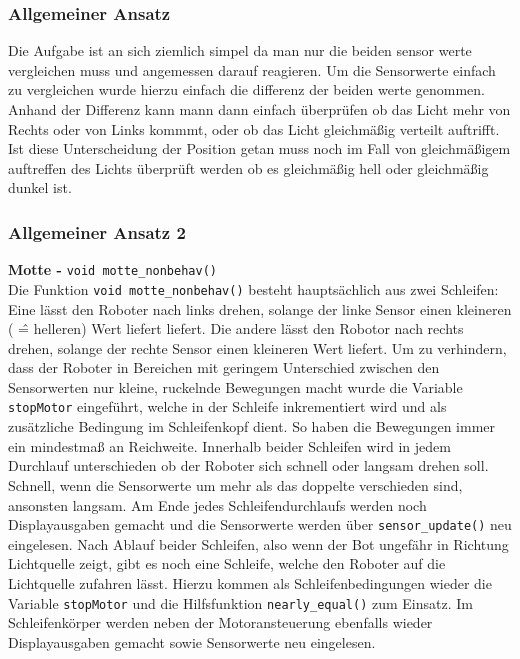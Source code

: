 \subsubsection{Allgemeiner Ansatz}

Die Aufgabe ist an sich ziemlich simpel da man nur die beiden sensor werte vergleichen muss und angemessen darauf reagieren.
Um die Sensorwerte einfach zu vergleichen wurde hierzu einfach die differenz der beiden werte genommen.
Anhand der Differenz kann mann dann einfach überprüfen ob das Licht mehr von Rechts oder von Links kommmt, oder ob das Licht gleichmäßig verteilt auftrifft.
Ist diese Unterscheidung der Position getan muss noch im Fall von gleichmäßigem auftreffen des Lichts überprüft werden ob es gleichmäßig hell oder gleichmäßig dunkel ist.



\subsubsection{Allgemeiner Ansatz 2 }

\textbf{Motte - }\verb+void motte_nonbehav()+\\

Die Funktion \verb+void motte_nonbehav()+ besteht hauptsächlich aus zwei Schleifen: Eine lässt den Roboter nach links drehen, solange der linke Sensor einen kleineren ( \^= helleren) Wert liefert liefert. Die andere lässt den Robotor nach rechts drehen, solange der rechte Sensor einen kleineren Wert liefert. Um zu verhindern, dass der Roboter in Bereichen mit geringem Unterschied zwischen den Sensorwerten nur kleine, ruckelnde Bewegungen macht wurde die Variable \verb+stopMotor+ eingeführt, welche in der Schleife inkrementiert wird und als zusätzliche Bedingung im Schleifenkopf dient. So haben die Bewegungen immer ein mindestmaß an Reichweite.
Innerhalb beider Schleifen wird in jedem Durchlauf unterschieden ob der Roboter sich schnell oder langsam drehen soll. Schnell, wenn die Sensorwerte um mehr als das doppelte verschieden sind, ansonsten langsam.
Am Ende jedes Schleifendurchlaufs werden noch Displayausgaben gemacht und die Sensorwerte werden über \verb+sensor_update()+ neu eingelesen.
Nach Ablauf beider Schleifen, also wenn der Bot ungefähr in Richtung Lichtquelle zeigt, gibt es noch eine Schleife, welche den Roboter auf die Lichtquelle zufahren lässt. Hierzu kommen als Schleifenbedingungen wieder die Variable \verb+stopMotor+ und die Hilfsfunktion \verb+nearly_equal()+ zum Einsatz. Im Schleifenkörper werden neben der Motoransteuerung ebenfalls wieder Displayausgaben gemacht sowie Sensorwerte neu eingelesen.\\

